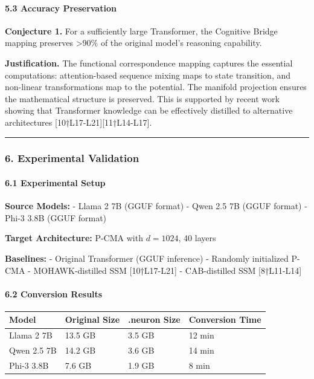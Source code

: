 \documentclass[
  11pt,
  a4paper,
]{article}
\begin{document}
\paragraph{5.3 Accuracy Preservation}\label{accuracy-preservation}

\textbf{Conjecture 1.} For a sufficiently large Transformer, the
Cognitive Bridge mapping preserves \textgreater90\% of the original
model's reasoning capability.

\textbf{Justification.} The functional correspondence mapping captures
the essential computations: attention-based sequence mixing maps to
state transition, and non-linear transformations map to the potential.
The manifold projection ensures the mathematical structure is preserved.
This is supported by recent work showing that Transformer knowledge can
be effectively distilled to alternative architectures
{[}10†L17-L21{]}{[}11†L14-L17{]}.

\begin{center}\rule{0.5\linewidth}{0.5pt}\end{center}

\subsubsection{6. Experimental
Validation}\label{experimental-validation-1}

\paragraph{6.1 Experimental Setup}\label{experimental-setup}

\textbf{Source Models:} - Llama 2 7B (GGUF format) - Qwen 2.5 7B (GGUF
format) - Phi-3 3.8B (GGUF format)

\textbf{Target Architecture:} P-CMA with \(d = 1024\), 40 layers

\textbf{Baselines:} - Original Transformer (GGUF inference) - Randomly
initialized P-CMA - MOHAWK-distilled SSM {[}10†L17-L21{]} -
CAB-distilled SSM {[}8†L11-L14{]}

\paragraph{6.2 Conversion Results}\label{conversion-results}

\begin{longtable}[]{@{}llll@{}}
\toprule\noalign{}
Model & Original Size & .neuron Size & Conversion Time \\
\midrule\noalign{}
\endhead
\bottomrule\noalign{}
\endlastfoot
Llama 2 7B & 13.5 GB & 3.5 GB & 12 min \\
Qwen 2.5 7B & 14.2 GB & 3.6 GB & 14 min \\
Phi-3 3.8B & 7.6 GB & 1.9 GB & 8 min \\
\end{longtable}
\end{document}
